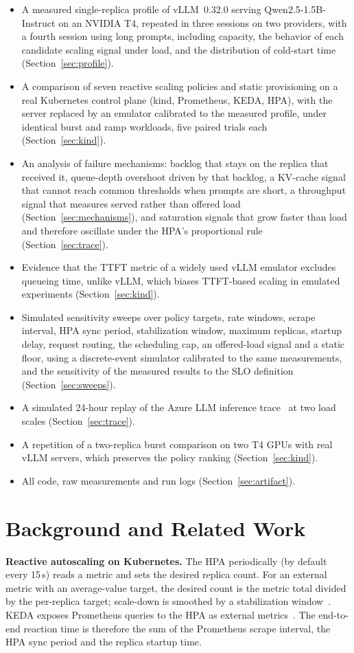 \documentclass[10pt,conference]{IEEEtran}
\begin{document}
\begin{itemize}
\item A measured single-replica profile of vLLM~0.32.0 serving
  Qwen2.5-1.5B-Instruct on an NVIDIA T4, repeated in three sessions on two
  providers, with a fourth session using long prompts, including capacity, the behavior of each candidate scaling
  signal under load, and the distribution of cold-start time
  (Section~\ref{sec:profile}).
\item A comparison of seven reactive scaling policies and static provisioning
  on a real Kubernetes control plane (kind, Prometheus, KEDA, HPA), with the
  server replaced by an emulator calibrated to the measured profile, under
  identical burst and ramp workloads, five paired trials each
  (Section~\ref{sec:kind}).
\item An analysis of failure mechanisms: backlog that stays on the replica
  that received it, queue-depth overshoot driven by that backlog, a KV-cache
  signal that cannot reach common thresholds when prompts are short, a
  throughput signal that measures served rather than offered load
  (Section~\ref{sec:mechanisms}), and saturation signals that grow faster
  than load and therefore oscillate under the HPA's proportional rule
  (Section~\ref{sec:trace}).
\item Evidence that the TTFT metric of a widely used vLLM emulator excludes
  queueing time, unlike vLLM, which biases TTFT-based scaling in emulated
  experiments (Section~\ref{sec:kind}).
\item Simulated sensitivity sweeps over policy targets, rate windows, scrape
  interval, HPA sync period, stabilization window, maximum replicas, startup
  delay, request routing, the scheduling cap, an offered-load signal and a
  static floor, using a discrete-event simulator calibrated to the same
  measurements, and the sensitivity of the measured results to the SLO
  definition (Section~\ref{sec:sweeps}).
\item A simulated 24-hour replay of the Azure LLM inference
  trace~\cite{azuretrace2024} at two load scales (Section~\ref{sec:trace}).
\item A repetition of a two-replica burst comparison on two T4 GPUs with
  real vLLM servers, which preserves the policy ranking
  (Section~\ref{sec:kind}).
\item All code, raw measurements and run logs (Section~\ref{sec:artifact}).
\end{itemize}

\section{Background and Related Work}
\label{sec:related}
\textbf{Reactive autoscaling on Kubernetes.} The HPA periodically (by default
every 15\,s) reads a metric and sets the desired replica count. For an
external metric with an average-value target, the desired count is the metric
total divided by the per-replica target; scale-down is smoothed by a
stabilization window~\cite{k8shpa}. KEDA exposes Prometheus queries to the HPA
as external metrics~\cite{keda}. The end-to-end reaction time is therefore
the sum of the Prometheus scrape interval, the HPA sync period and the
replica startup time.
\end{document}

